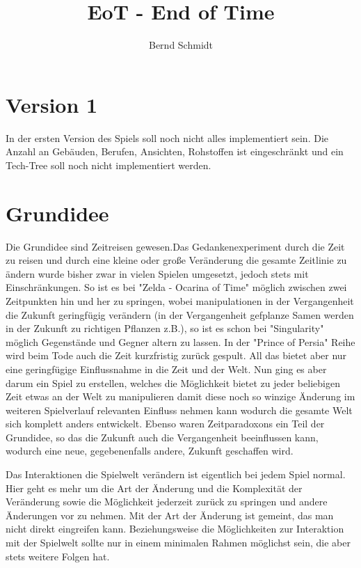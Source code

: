 \documentclass[11pt]{article}
\title{\textbf{EoT - End of Time}}
\author{Bernd Schmidt}
\date{}
\begin{document}
\maketitle

\section{Version 1}
In der ersten Version des Spiels soll noch nicht alles implementiert sein. Die Anzahl an Gebäuden, Berufen, Ansichten, Rohstoffen ist eingeschränkt und ein Tech-Tree soll noch nicht implementiert werden. 

\section{Grundidee}

Die Grundidee sind Zeitreisen gewesen.Das Gedankenexperiment durch die Zeit zu reisen und durch eine kleine oder große Veränderung die gesamte Zeitlinie zu ändern wurde bisher zwar in vielen Spielen umgesetzt, jedoch stets mit Einschränkungen. So ist es bei "Zelda - Ocarina of Time" möglich zwischen zwei Zeitpunkten hin und her zu springen, wobei manipulationen in der Vergangenheit die Zukunft geringfügig verändern (in der Vergangenheit gefplanze Samen werden in der Zukunft zu richtigen Pflanzen z.B.), so ist es schon bei "Singularity" möglich Gegenstände und Gegner altern zu lassen. In der "Prince of Persia" Reihe wird beim Tode auch die Zeit kurzfristig zurück gespult. All das bietet aber nur eine geringfügige Einflussnahme in die Zeit und der Welt.
Nun ging es aber darum ein Spiel zu erstellen, welches die Möglichkeit bietet zu jeder beliebigen Zeit etwas an der Welt zu manipulieren damit diese noch so winzige Änderung im weiteren Spielverlauf relevanten Einfluss nehmen kann wodurch die gesamte Welt sich komplett anders entwickelt. Ebenso waren  Zeitparadoxons ein Teil der Grundidee, so das die Zukunft auch die Vergangenheit beeinflussen kann, wodurch eine neue, gegebenenfalls andere, Zukunft geschaffen wird.

Das Interaktionen die Spielwelt verändern ist eigentlich bei jedem Spiel normal. Hier geht es mehr um die Art der Änderung und die Komplexität der Veränderung sowie die Möglichkeit jederzeit zurück zu springen und andere Änderungen vor zu nehmen.
Mit der Art der Änderung ist gemeint, das man nicht direkt eingreifen kann. Beziehungsweise die Möglichkeiten zur Interaktion mit der Spielwelt sollte nur in einem minimalen Rahmen möglichst sein, die aber stets weitere Folgen hat.
\end{document}
